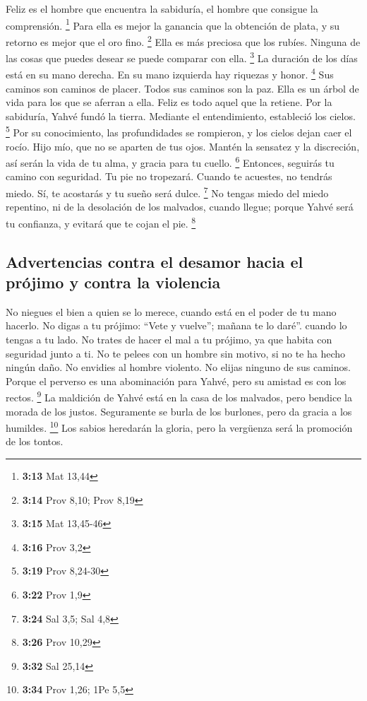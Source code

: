 \begin{paracol}{2}
 Feliz es el hombre que encuentra la sabiduría, el hombre
que consigue la comprensión. \footnote{\textbf{3:13} Mat 13,44}
 Para ella es mejor la ganancia que la obtención de
plata, y su retorno es mejor que el oro fino. \footnote{\textbf{3:14}
  Prov 8,10; Prov 8,19}  Ella es más preciosa que los
rubíes. Ninguna de las cosas que puedes desear se puede comparar con
ella. \footnote{\textbf{3:15} Mat 13,45-46}  La duración
de los días está en su mano derecha. En su mano izquierda hay riquezas y
honor. \footnote{\textbf{3:16} Prov 3,2}  Sus caminos son
caminos de placer. Todos sus caminos son la paz.  Ella es
un árbol de vida para los que se aferran a ella. Feliz es todo aquel que
la retiene.  Por la sabiduría, Yahvé fundó la tierra.
Mediante el entendimiento, estableció los cielos. \footnote{\textbf{3:19}
  Prov 8,24-30}  Por su conocimiento, las profundidades
se rompieron, y los cielos dejan caer el rocío.  Hijo
mío, que no se aparten de tus ojos. Mantén la sensatez y la discreción,
 así serán la vida de tu alma, y gracia para tu cuello.
\footnote{\textbf{3:22} Prov 1,9}  Entonces, seguirás tu
camino con seguridad. Tu pie no tropezará.  Cuando te
acuestes, no tendrás miedo. Sí, te acostarás y tu sueño será dulce.
\footnote{\textbf{3:24} Sal 3,5; Sal 4,8}  No tengas
miedo del miedo repentino, ni de la desolación de los malvados, cuando
llegue;  porque Yahvé será tu confianza, y evitará que te
cojan el pie. \footnote{\textbf{3:26} Prov 10,29}

\hypertarget{advertencias-contra-el-desamor-hacia-el-pruxf3jimo-y-contra-la-violencia}{%
\subsection{Advertencias contra el desamor hacia el prójimo y contra la
violencia}\label{advertencias-contra-el-desamor-hacia-el-pruxf3jimo-y-contra-la-violencia}}

 No niegues el bien a quien se lo merece, cuando está en
el poder de tu mano hacerlo.  No digas a tu prójimo:
``Vete y vuelve''; mañana te lo daré''. cuando lo tengas a tu lado.
 No trates de hacer el mal a tu prójimo, ya que habita
con seguridad junto a ti.  No te pelees con un hombre sin
motivo, si no te ha hecho ningún daño.  No envidies al
hombre violento. No elijas ninguno de sus caminos. 
Porque el perverso es una abominación para Yahvé, pero su amistad es con
los rectos. \footnote{\textbf{3:32} Sal 25,14}  La
maldición de Yahvé está en la casa de los malvados, pero bendice la
morada de los justos.  Seguramente se burla de los
burlones, pero da gracia a los humildes. \footnote{\textbf{3:34} Prov
  1,26; 1Pe 5,5}  Los sabios heredarán la gloria, pero la
vergüenza será la promoción de los tontos.


\end{paracol}
